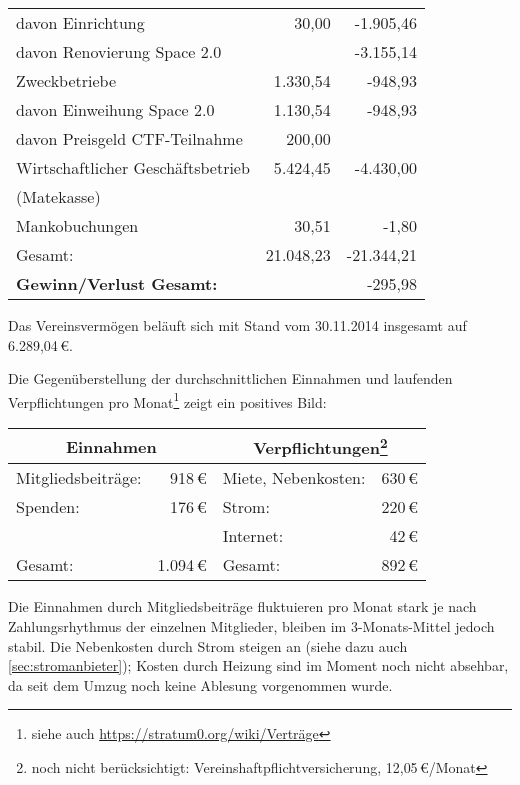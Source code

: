 \documentclass[a4paper,12pt]{scrartcl}
\begin{document}
\begin{longtable}{|l|r|r|}
  \quad davon Einrichtung           &       30{,}00 &  -1{.}905{,}46 \\
  \quad davon Renovierung Space 2.0 &               &  -3{.}155{,}14 \\
  \hline
  Zweckbetriebe                     &  1{.}330{,}54 &      -948{,}93 \\
  \quad davon Einweihung Space 2.0  &  1{.}130{,}54 &      -948{,}93 \\
  \quad davon Preisgeld CTF-Teilnahme &    200{,}00 &                \\
  \hline
  Wirtschaftlicher Geschäftsbetrieb &  5{.}424{,}45 &  -4{.}430{,}00 \\
  \quad (Matekasse) && \\
  \hline
  Mankobuchungen                    &       30{,}51 &        -1{,}80 \\
  \hline
  Gesamt:                           & 21{.}048{,}23 & -21{.}344{,}21 \\
  \hline\hline
  \textbf{Gewinn/Verlust Gesamt:}   &               &      -295{,}98 \\
  \hline
\end{longtable}
\vspace{-1\baselineskip}

Das Vereinsvermögen beläuft sich mit Stand vom 30.11.2014 insgesamt auf
6{.}289{,}04\,€.

Die Gegenüberstellung der durchschnittlichen Einnahmen und laufenden
Verpflichtungen pro Monat\footnote{siehe auch
\url{https://stratum0.org/wiki/Verträge}} zeigt ein positives Bild:

\begin{longtable}{|lr|lr|} %
  \hline
  \multicolumn{2}{|c|}{\textbf{Einnahmen}} &
  \multicolumn{2}{|c|}{\textbf{Verpflichtungen}\footnote{noch nicht
  berücksichtigt: Vereinshaftpflichtversicherung, 12{,}05\,€/Monat}} \\
  \hline
  Mitgliedsbeiträge: &     918\,€ & Miete, Nebenkosten:    & 630\,€ \\
  Spenden:           &     176\,€ & Strom:                 & 220\,€ \\
                     &            & Internet:              &  42\,€ \\
  \hline\hline
  Gesamt:            & 1{.}094\,€ & Gesamt:                & 892\,€ \\
  \hline
\end{longtable}

Die Einnahmen durch Mitgliedsbeiträge fluktuieren pro Monat stark je nach
Zahlungsrhythmus der einzelnen Mitglieder, bleiben im 3-Monats-Mittel jedoch
stabil. Die Nebenkosten durch Strom steigen an (siehe dazu auch
\ref{sec:stromanbieter}); Kosten durch Heizung sind im Moment noch nicht
absehbar, da seit dem Umzug noch keine Ablesung vorgenommen wurde.
\end{document}
